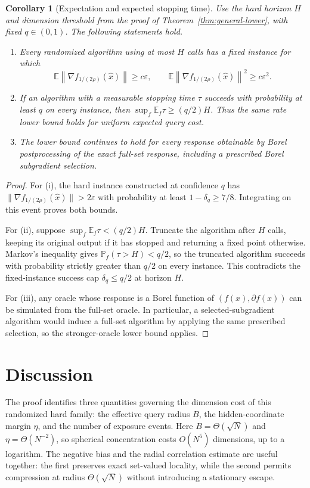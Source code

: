 \documentclass[11pt,a4paper]{article}
\newcommand{\E}{\mathbb{E}}
\newcommand{\Prob}{\mathbb{P}}
\newcommand{\eps}{\varepsilon}
\newcommand{\norm}[1]{\left\lVert #1\right\rVert}
\newtheorem{corollary}[theorem]{Corollary}
\theoremstyle{definition}
\numberwithin{equation}{section}
\begin{document}
\begin{corollary}[Expectation and expected stopping time]\label{cor:variants}
Use the hard horizon $H$ and dimension threshold from the proof of
Theorem~\ref{thm:general-lower}, with fixed $q\in(0,1)$.
The following statements hold.
\begin{enumerate}[label=(\roman*)]
\item Every randomized algorithm using at most $H$ calls has a fixed instance for which
\[
 \E\norm{\nabla f_{1/(2\rho)}(\widehat x)}\ge c\eps,
 \qquad
 \E\norm{\nabla f_{1/(2\rho)}(\widehat x)}^2\ge c\eps^2.
\]
\item If an algorithm with a measurable stopping time $\tau$ succeeds with
probability at least $q$ on every instance, then
$\sup_f\E_f\tau\ge(q/2)H$. Thus the same rate lower bound holds for
uniform expected query cost.
\item The lower bound continues to hold for every response obtainable by Borel postprocessing of the exact full-set response, including a prescribed Borel subgradient selection.
\end{enumerate}
\end{corollary}

\begin{proof}
For (i), the hard instance constructed at confidence $q$ has
$\|\nabla f_{1/(2\rho)}(\widehat x)\|>2\eps$ with probability at least
$1-\delta_q\ge7/8$. Integrating on this event proves both bounds.

For (ii), suppose $\sup_f\E_f\tau<(q/2)H$.
Truncate the algorithm after $H$ calls, keeping its original output if it
has stopped and returning a fixed point otherwise. Markov's inequality gives
$\Prob_f(\tau>H)<q/2$, so the truncated algorithm succeeds with probability
strictly greater than $q/2$ on every instance. This contradicts the
fixed-instance success cap $\delta_q\le q/2$ at horizon $H$.

For (iii), any oracle whose response is a Borel function of $(f(x),\partial f(x))$ can be simulated from the full-set oracle.  In particular, a selected-subgradient algorithm would induce a full-set algorithm by applying the same prescribed selection, so the stronger-oracle lower bound applies.
\end{proof}


\section{Discussion}\label{sec:discussion}

The proof identifies three quantities governing the dimension cost of this
randomized hard family: the effective query radius $B$, the hidden-coordinate
margin $\eta$, and the number of exposure events. Here
$B=\Theta(\sqrt N)$ and $\eta=\Theta(N^{-2})$, so spherical concentration
costs $O(N^5)$ dimensions, up to a logarithm. The negative bias and the
radial correlation estimate are useful together: the first preserves exact
set-valued locality, while the second permits compression at radius
$\Theta(\sqrt N)$ without introducing a stationary escape.
\end{document}
